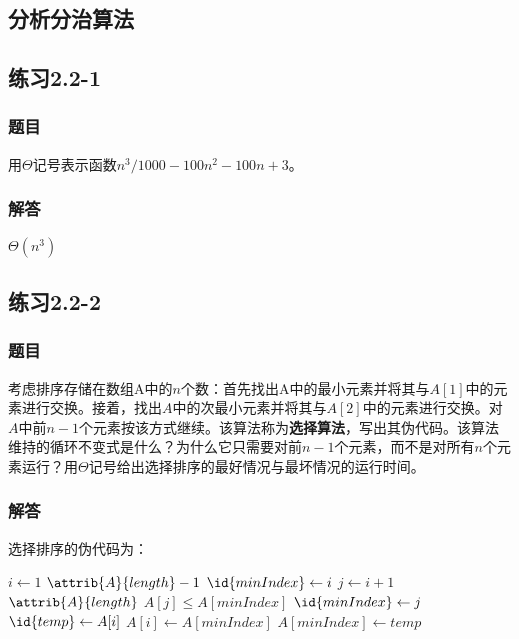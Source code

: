 \documentclass[UTF8,a4paper,zihao=-4,oneside,onecolumn,scheme=chinese,autoindent=true]{ctexbook}
\begin{document}
\subsection{分析分治算法}


\subsection*{练习2.2-1}
\subsubsection*{题目}
用$\Theta$记号表示函数$n^3/1000-100n^2-100n+3$。
\subsubsection*{解答}
$\Theta(n^3)$

\subsection*{练习2.2-2}
\subsubsection*{题目}
考虑排序存储在数组A中的$n$个数：首先找出A中的最小元素并将其与$A[1]$中的元素进行交换。接着，找出$A$中的次最小元素并将其与$A[2]$中的元素进行交换。对$A$中前$n-1$个元素按该方式继续。该算法称为\textbf{选择算法}，写出其伪代码。该算法维持的循环不变式是什么？为什么它只需要对前$n-1$个元素，而不是对所有$n$个元素运行？用$\Theta$记号给出选择排序的最好情况与最坏情况的运行时间。
\subsubsection*{解答}
选择排序的伪代码为：
\begin{codebox}
    \li \For $i \gets 1$ \To $\attrib{A}{length} - 1$ \Do
    \li     $\id{minIndex} \gets i$
    \li     \For $j \gets i + 1$ \To $\attrib{A}{length}$ \Do
    \li         \If $A[j] \le A[minIndex]$ \Then
    \li             $\id{minIndex} \gets j$
    \End
    \End
    \li     $\id{temp} \gets A[i]$
    \li     $A[i] \gets A[minIndex]$
    \li     $A[minIndex] \gets temp$
    \End
\end{codebox}
\end{document}
